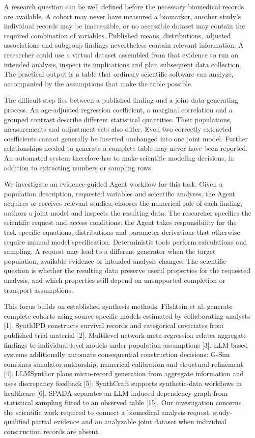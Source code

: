 \documentclass[10pt,twocolumn]{article}
\begin{document}
A research question can be well defined before the necessary biomedical records are available. A cohort may never have measured a biomarker, another study's individual records may be inaccessible, or no accessible dataset may contain the required combination of variables. Published means, distributions, adjusted associations and subgroup findings nevertheless contain relevant information. A researcher could use a virtual dataset assembled from that evidence to run an intended analysis, inspect its implications and plan subsequent data collection. The practical output is a table that ordinary scientific software can analyze, accompanied by the assumptions that make the table possible.


The difficult step lies between a published finding and a joint data-generating process. An age-adjusted regression coefficient, a marginal correlation and a grouped contrast describe different statistical quantities. Their populations, measurements and adjustment sets also differ. Even two correctly extracted coefficients cannot generally be inserted unchanged into one joint model. Further relationships needed to generate a complete table may never have been reported. An automated system therefore has to make scientific modeling decisions, in addition to extracting numbers or sampling rows.


We investigate an evidence-guided Agent workflow for this task. Given a population description, requested variables and scientific analyses, the Agent acquires or receives relevant studies, chooses the numerical role of each finding, authors a joint model and inspects the resulting data. The researcher specifies the scientific request and access conditions; the Agent takes responsibility for the task-specific equations, distributions and parameter derivations that otherwise require manual model specification. Deterministic tools perform calculations and sampling. A request may lead to a different generator when the target population, available evidence or intended analysis changes. The scientific question is whether the resulting data preserve useful properties for the requested analysis, and which properties still depend on unsupported completion or transport assumptions.


This focus builds on established synthesis methods. Filshtein et al. generate complete cohorts using source-specific models estimated by collaborating analysts [1]. SynthIPD constructs survival records and categorical covariates from published trial material [2]. Multilevel network meta-regression relates aggregate findings to individual-level models under population assumptions [3]. LLM-based systems additionally automate consequential construction decisions: G-Sim combines simulator authorship, numerical calibration and structural refinement [4]; LLMSynthor plans micro-record generation from aggregate information and uses discrepancy feedback [5]; SynthCraft supports synthetic-data workflows in healthcare [6]. SPADA separates an LLM-induced dependency graph from statistical sampling fitted to an observed table [15]. Our investigation concerns the scientific work required to connect a biomedical analysis request, study-qualified partial evidence and an analyzable joint dataset when individual construction records are absent.
\end{document}
